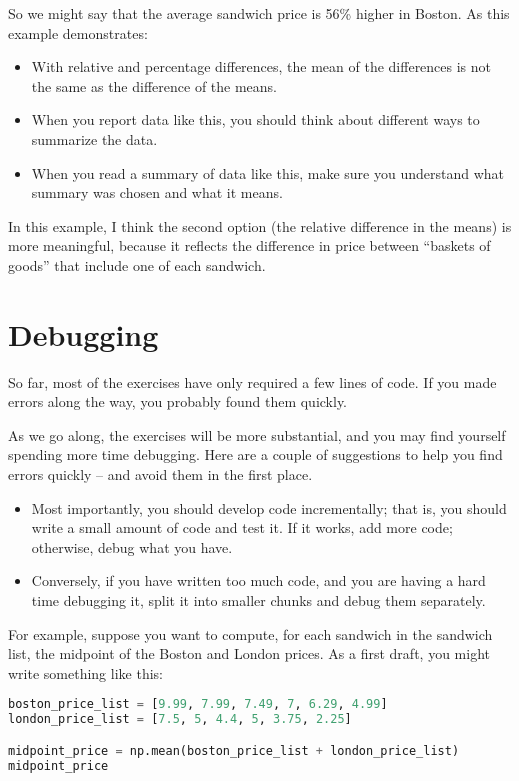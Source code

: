 So we might say that the average sandwich price is 56\% higher in
Boston. As this example demonstrates:

\begin{itemize}
\item
  With relative and percentage differences, the mean of the differences
  is not the same as the difference of the means.
\item
  When you report data like this, you should think about different ways
  to summarize the data.
\item
  When you read a summary of data like this, make sure you understand
  what summary was chosen and what it means.
\end{itemize}

In this example, I think the second option (the relative difference in
the means) is more meaningful, because it reflects the difference in
price between ``baskets of goods'' that include one of each sandwich.

\hypertarget{debugging}{%
\section{Debugging}\label{debugging}}

So far, most of the exercises have only required a few lines of code. If
you made errors along the way, you probably found them quickly.

As we go along, the exercises will be more substantial, and you may find
yourself spending more time debugging. Here are a couple of suggestions
to help you find errors quickly -- and avoid them in the first place.

\begin{itemize}
\item
  Most importantly, you should develop code incrementally; that is, you
  should write a small amount of code and test it. If it works, add more
  code; otherwise, debug what you have.
\item
  Conversely, if you have written too much code, and you are having a
  hard time debugging it, split it into smaller chunks and debug them
  separately.
\end{itemize}

For example, suppose you want to compute, for each sandwich in the
sandwich list, the midpoint of the Boston and London prices. As a first
draft, you might write something like this:

\begin{lstlisting}[language=Python,style=source]
boston_price_list = [9.99, 7.99, 7.49, 7, 6.29, 4.99]
london_price_list = [7.5, 5, 4.4, 5, 3.75, 2.25]

midpoint_price = np.mean(boston_price_list + london_price_list)
midpoint_price
\end{lstlisting}


